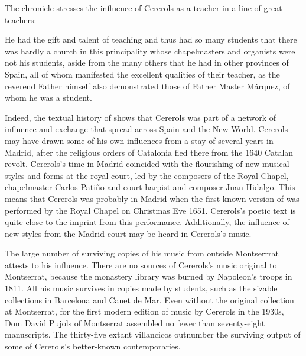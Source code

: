 The chronicle stresses the influence of Cererols as a teacher in a line of great
teachers:
\begin{quoting}
    He had the gift and talent of teaching and thus had so many students that
    there was hardly a church in this principality  whose
    chapelmasters and organists were not his students, aside from the many
    others that he had in other provinces of Spain, all of whom manifested the
    excellent qualities of their teacher, as the reverend Father himself also
    demonstrated those of Father Master Márquez, of whom he  was a
    student.%
    \Autocite[7, note 2]{Estrada:CererolsBio}
\end{quoting}
Indeed, the textual history of  shows that Cererols
was part of a network of influence and exchange that spread across Spain and
the New World. 
Cererols may have drawn some of his own influences from a stay of several years
in Madrid, after the religious orders of Catalonia fled there from the 1640
Catalan revolt.
Cererols's time in Madrid coincided with the flourishing of new musical styles
and forms at the royal court, led by the composers of the Royal Chapel,
chapelmaster Carlos Patiño and court harpist and composer Juan Hidalgo.%
    \Autocites
    {Stein:Songs}
    {Rodriguez:Villancico}
This means that Cererols was probably in Madrid when the first known version of
 was performed by the Royal Chapel on Christmas Eve
1651.
Cererols's poetic text is quite close to the imprint from this performance.
Additionally, the influence of new styles from the Madrid court may be heard in
Cererols's music.


The large number of surviving copies of his music from outside Montserrrat
attests to his influence.
There are no sources of Cererols's music original to Montserrat, because the
monastery library was burned by Napoleon's troops in 1811.
All his music survives in copies made by students, such as the sizable
collections in Barcelona and Canet de Mar.
Even without the original collection at Montserrat, for the first modern edition
of music by Cererols in the 1930s, Dom David Pujols of Montserrat assembled no
fewer than seventy-eight manuscripts.%
    \Autocite{Cererols:MEM-VC}
The thirty-five extant villancicos outnumber the surviving output of some of
Cererols's better-known contemporaries.


